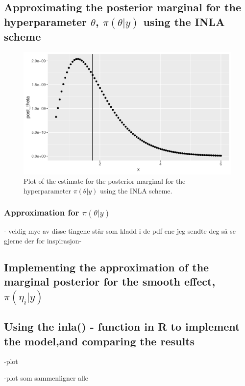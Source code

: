 \subsection{Approximating the posterior marginal for the hyperparameter $\theta$, $\pi(\theta|y)$ using the INLA scheme}

\begin{figure}[h]
    \centering
    \includegraphics[width=\textwidth]{Images/post_theta_inla.pdf}
    \caption{Plot of the estimate for the posterior marginal for the hyperparameter $\pi(\theta|y)$ using the INLA scheme.}
    \label{fig:post_theta_inla}
\end{figure}
 
 
\subsubsection{Approximation for $\pi(\theta|y)$}


- veldig mye av disse tingene står som kladd i de pdf ene jeg sendte deg så se gjerne der for inspirasjon-


\subsection{Implementing the approximation of the marginal posterior for the smooth effect, $\pi(\eta_i | y)$}





\subsection{Using the inla() - function in R to implement the model,and comparing the results}
-plot 


-plot som sammenligner alle
